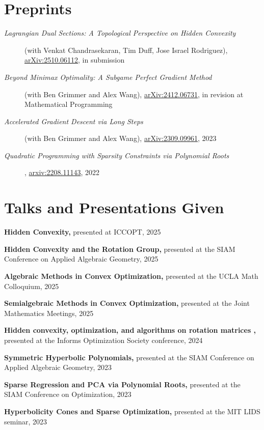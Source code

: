 \documentclass[10pt, letterpaper]{article}
\begin{document}
\section{Preprints}
\begin{description}
    \item[\emph{Lagrangian Dual Sections: A Topological Perspective on Hidden Convexity}] (with Venkat Chandrasekaran, Tim Duff, Jose Israel Rodriguez), \href{https://arxiv.org/abs/2510.06112}{arXiv:2510.06112}, in submission

    \item[\emph{Beyond Minimax Optimality: A Subgame Perfect Gradient Method}] (with Ben Grimmer and Alex Wang), \href{https://arxiv.org/abs/2412.06731}{arXiv:2412.06731}, in revision at Mathematical Programming

    \item[\emph{Accelerated Gradient Descent via Long Steps}] (with Ben Grimmer and Alex Wang), \href{https://arxiv.org/abs/2309.09961}{arXiv:2309.09961}, 2023

    \item[\emph{Quadratic Programming with Sparsity Constraints via Polynomial Roots}], 
\href{https://arxiv.org/abs/2208.11143}{arxiv:2208.11143}, 2022
\end{description}

\section{Talks and Presentations Given}
{\bf  Hidden Convexity,} presented at ICCOPT, 2025

{\bf  Hidden Convexity and the Rotation Group,} presented at the SIAM Conference on Applied Algebraic Geometry, 2025

{\bf  Algebraic Methods in Convex Optimization,} presented at the UCLA Math Colloquium, 2025

{\bf  Semialgebraic Methods in Convex Optimization,} presented at the Joint Mathematics Meetings, 2025 

{\bf  Hidden convexity, optimization, and algorithms on rotation matrices  ,} presented at the Informs Optimization Society conference, 2024 

{\bf  Symmetric Hyperbolic Polynomials,} presented at the SIAM Conference on Applied Algebraic Geometry, 2023 

{\bf  Sparse Regression and PCA via Polynomial Roots,} presented at the SIAM Conference on Optimization, 2023 

{\bf  Hyperbolicity Cones and Sparse Optimization,} presented at the MIT LIDS seminar, 2023 
\end{document}
